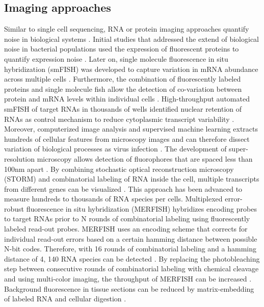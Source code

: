 \subsection{Imaging approaches}

Similar to single cell sequencing, RNA or protein imaging approaches quantify noise in biological systems \citep{Harton2017a}. Initial studies that addressed the extend of biological noise in bacterial populations used the expression of fluorescent proteins to quantify expression noise \citep{Elowitz2002, Blake2003}. Later on, single molecule fluorescence in situ hybridization (smFISH) was developed to capture variation in mRNA abundance across multiple cells \citep{Fang2013a, Lyubimova2013, Sanchez2013}. Furthermore, the combination of fluorescently labeled proteins and single molecule fish allow the detection of co-variation between protein and mRNA levels within individual cells \citep{Taniguchi2011}. High-throughput automated smFISH of target RNAs in thousands of wells \citep{Battich2013} identified nuclear retention of RNAs as control mechanism to reduce cytoplasmic transcript variability \citep{Battich2015a}. Moreover, computerized image analysis and supervised machine learning extracts hundreds of cellular features from microscopy images and can therefore dissect variation of biological processes as virus infection \citep{Snijder2009}.
The development of super-resolution microscopy allows detection of fluorophores that are spaced less than 100nm apart \citep{Sydor2015}. By combining stochastic optical reconstruction microscopy (STORM) and combinatorial labeling of RNA inside the cell, multiple transcripts from different genes can be visualized \citep{Lubeck2012}. This approach has been advanced to measure hundreds to thousands of RNA species per cells. Multiplexed error-robust fluorescence in situ hybridization (MERFISH) hybridizes encoding probes to target RNAs prior to N rounds of combinatorial labeling using fluorescently labeled read-out probes. MERFISH uses an encoding scheme that corrects for individual read-out errors based on a certain hamming distance between possible N-bit codes. Therefore, with 16 rounds of combinatorial labeling and a hamming distance of 4, 140 RNA species can be detected \citep{Chen2015}. By replacing the photobleaching step between consecutive rounds of combinatorial labeling with chemical cleavage and using multi-color imaging, the throughput of MERFISH can be increased \citep{Moffitt2016a}. Background fluorescence in tissue sections can be reduced by matrix-embedding of labeled RNA and cellular digestion \citep{Moffitt2016}.\\

